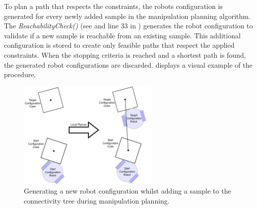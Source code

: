To plan a path that respects the constraints, the robots configuration is generated for every newly added sample in the manipulation planning algorithm. The \textit{ReachabilityCheck()} (see  and line 33 in ) generates the robot configuration to validate if a new sample is reachable from an existing sample. This additional configuration is stored to create only feasible paths that respect the applied constraints. When the stopping criteria is reached and a shortest path is found, the generated robot configurations are discarded.  displays a visual example of the procedure.\bs

\begin{figure}[H]
    \centering
    \includegraphics[width=0.6\textwidth]{figures/manipulation_local_planner}
    \caption{Generating a new robot configuration whilst adding a sample to the connectivity tree during manipulation planning.}%
    \label{fig:manipulation_plannig_local_planner}
\end{figure}

